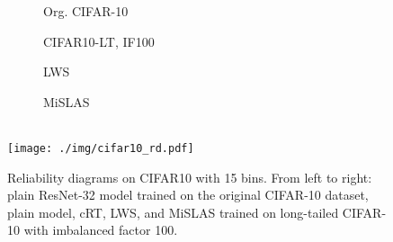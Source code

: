\documentclass[final]{cvpr}
\begin{document}
	\begin{figure}[h]
		\begin{subfigure}{0.195\linewidth}
			\begin{center}
				{\quad \quad Org. CIFAR-10}
			\end{center}
		\end{subfigure}
		\hfill
		\begin{subfigure}{0.195\linewidth}
			\centering
			{\quad\hspace{4.5pt}  CIFAR10-LT, IF100}
		\end{subfigure}
		\hfill
		\begin{subfigure}{0.195\linewidth}
			\centering
			{}
		\end{subfigure} 
		\hfill
		\begin{subfigure}{0.195\linewidth}
			\centering
			{\hspace{2pt}  LWS}
		\end{subfigure} 
		\hfill
		\begin{subfigure}{0.195\linewidth}
			\centering
			{ MiSLAS}
		\end{subfigure}\\
		\centering
		\texttt{[image: ./img/cifar10\_rd.pdf]} \\
		\vspace{-5pt}
		\caption{Reliability diagrams on CIFAR10 with 15 bins. From left to right: plain ResNet-32 model trained on the original CIFAR-10 dataset, plain model, cRT, LWS, and MiSLAS trained on long-tailed CIFAR-10 with imbalanced factor 100.}
		\vspace{-10pt}
		\label{fig:more_rd_cifar10}
	\end{figure}
	
\end{document}
